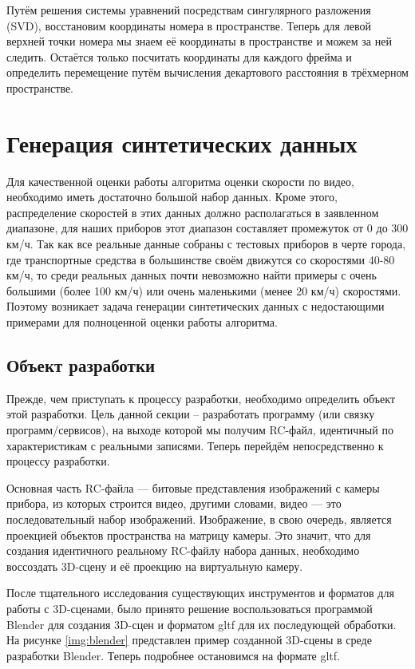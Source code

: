 \documentclass[specification,annotation,times]{itmo-student-thesis}
\begin{document}
Путём решения системы уравнений посредствам сингулярного разложения (SVD), восстановим координаты номера в пространстве. Теперь для левой верхней точки номера мы знаем её координаты в пространстве и можем за ней следить. Остаётся только посчитать координаты для каждого фрейма и определить перемещение путём вычисления декартового расстояния в трёхмерном пространстве.




\section{Генерация синтетических данных}
Для качественной оценки работы алгоритма оценки скорости по видео, необходимо иметь достаточно большой набор данных. Кроме этого, распределение скоростей в этих данных должно располагаться в заявленном диапазоне, для наших приборов этот диапазон составляет промежуток от 0 до 300 км/ч. Так как все реальные данные собраны с тестовых приборов в черте города, где транспортные средства в большинстве своём движутся со скоростями 40-80 км/ч, то среди реальных данных почти невозможно найти примеры с очень большими (более 100 км/ч) или очень маленькими (менее 20 км/ч) скоростями. Поэтому возникает задача генерации синтетических данных с недостающими примерами для полноценной оценки работы алгоритма.

\subsection{Объект разработки}
Прежде, чем приступать к процессу разработки, необходимо определить объект этой разработки. Цель данной секции – разработать программу (или связку программ/сервисов), на выходе которой мы получим RC-файл, идентичный по характеристикам с реальными записями. Теперь перейдём непосредственно к процессу разработки.

Основная часть RC-файла --- битовые представления изображений с камеры прибора, из которых строится видео, другими словами, видео --- это последовательный набор изображений. Изображение, в свою очередь, является проекцией объектов пространства на матрицу камеры. Это значит, что для создания идентичного реальному RC-файлу набора данных, необходимо воссоздать 3D-сцену и её проекцию на виртуальную камеру.

После тщательного исследования существующих инструментов и форматов для работы с 3D-сценами, было принято решение воспользоваться программой Blender для создания 3D-сцен и форматом gltf для их последующей обработки. На рисунке \ref{img:blender} представлен пример созданной 3D-сцены в среде разработки Blender. Теперь подробнее остановимся на формате gltf.
\end{document}
